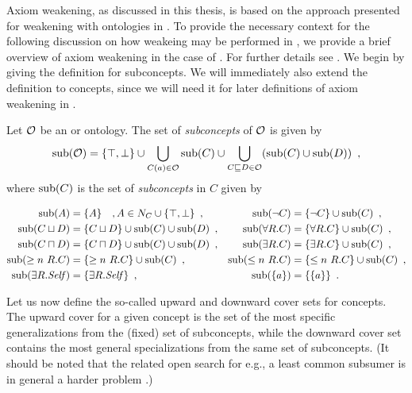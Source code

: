 
Axiom weakening, as discussed in this thesis, is based on the approach presented for weakening with \ALC ontologies in \cite{troquard2018repairing}. To provide the necessary context for the following discussion on how weakeing may be performed in \SROIQ, we provide a brief overview of axiom weakening in the case of \ALC. For further details see \cite{troquard2018repairing}.
%
We begin by giving the definition for subconcepts. We will immediately also extend the definition to \SROIQ concepts, since we will need it for later definitions of axiom weakening in \SROIQ.

\begin{definition}
  Let $\mathcal{O}$ be an \ALC or \SROIQ ontology. The set of \emph{subconcepts} of $\mathcal{O}$ is given by
  \begin{align*}
    {\ensuremath{\operatorname{sub}}}(\mathcal{O}) = \{\top, \bot\} \cup \bigcup_{C(a) \in \mathcal{O}} {\operatorname{sub}}(C) \cup \bigcup_{C \sqsubseteq D \in \mathcal{O}} ( {\operatorname{sub}}(C) \cup {\ensuremath{\operatorname{sub}}}(D) ) \enspace,
  \end{align*}
  where ${\operatorname{sub}}(C)$ is the set of \emph{subconcepts} in $C$ given by
  \begin{widepage}
    \vspace{-5mm}
    \begin{align*}
      {\ensuremath{\operatorname{sub}}}(A) &= \{ A \} \quad , A \in N_C \cup \{ \top, \bot \} \enspace, &
      {\operatorname{sub}}(\lnot C) &= \{ \lnot C \} \cup {\ensuremath{\operatorname{sub}}}(C) \enspace, \\
      {\operatorname{sub}}(C \sqcup D) &= \{ C \sqcup D \} \cup {\ensuremath{\operatorname{sub}}}(C) \cup {\ensuremath{\operatorname{sub}}}(D) \enspace, &
      {\operatorname{sub}}(\forall R.C) &= \{ \forall R.C \} \cup {\ensuremath{\operatorname{sub}}}(C) \enspace, \\
      {\operatorname{sub}}(C \sqcap D) &= \{ C \sqcap D \} \cup {\ensuremath{\operatorname{sub}}}(C) \cup {\ensuremath{\operatorname{sub}}}(D) \enspace, &
      {\operatorname{sub}}(\exists R.C) &= \{ \exists R.C \} \cup {\ensuremath{\operatorname{sub}}}(C) \enspace, \\
      {\operatorname{sub}}(\geq n~R.C) &= \{ \geq n~R.C \} \cup {\ensuremath{\operatorname{sub}}}(C) \enspace, &
      {\operatorname{sub}}(\leq n~R.C) &= \{ \leq n~R.C \} \cup {\ensuremath{\operatorname{sub}}}(C) \enspace, \\
      {\operatorname{sub}}(\exists R.\mathit{Self}) &= \{ \exists R.\mathit{Self} \} \enspace, &
      {\operatorname{sub}}(\{a\}) &= \{ \{a\} \} \enspace.
    \end{align*}
  \end{widepage}
\end{definition}

Let us now define the so-called upward and downward cover sets for concepts. The upward cover for a given concept is the set of the most specific generalizations from the (fixed) set of subconcepts, while the downward cover set contains the most general specializations from the same set of subconcepts. (It should be noted that the related open search for e.g., a least common subsumer is in general a harder problem \cite{baader2003least}.)

